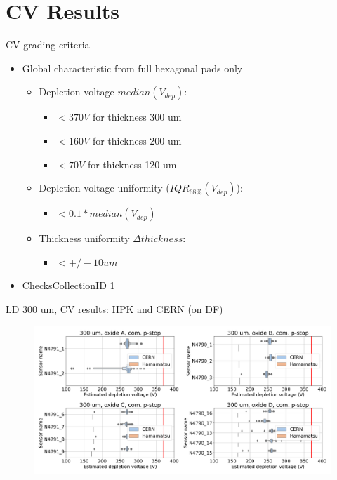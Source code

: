 \documentclass{beamer}
\begin{document}
\section{CV Results}

\begin{frame}{CV grading criteria}
  \begin{itemize}
      \item \alert{Global} characteristic from full hexagonal pads only
        \begin{itemize}
          \item Depletion voltage $ median(V_{dep}) $:
            \begin{itemize}
             \item $ < 370 V $ for thickness 300 um
             \item $ < 160 V $ for thickness 200 um
             \item $ < 70 V $ for thickness 120 um  
            \end{itemize}
          \item Depletion voltage uniformity ($ IQR_{68\%}(V_{dep}) $):
            \begin{itemize}
              \item $< 0.1 * median(V_{dep})$
            \end{itemize}
          \item Thickness uniformity ${\Delta} thickness$:
            \begin{itemize}
              \item $< +/- 10um $
            \end{itemize}
        \end{itemize}
        \item ChecksCollectionID 1
  \end{itemize}
\end{frame}

\begin{frame}{LD 300 um, CV results: HPK and CERN (on DF)}
    \begin{figure}
        \includegraphics[width=.9\textwidth]{plots/CV_ComparisonHPKCERN_300um_All.png}    
    \end{figure}
  \href{https://indico.cern.ch/event/1085830/contributions/4565314/attachments/2344490/3998306/IVCV_recent_HGCal_prototype_sensors_Readiness_Review.pdf}{}
\end{frame}
\end{document}
